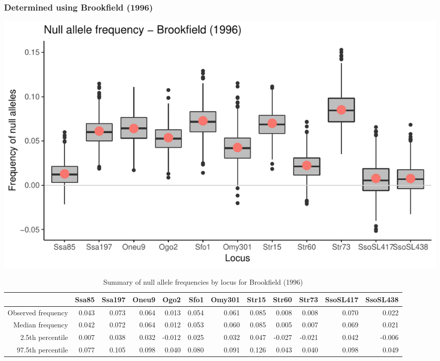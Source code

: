 \documentclass[a4paper]{scrartcl}\usepackage[]{graphicx}\usepackage[]{color}
\makeatletter
\def\maxwidth{ %
  \ifdim\Gin@nat@width>\linewidth
    \linewidth
  \else
    \Gin@nat@width
  \fi
}
\newenvironment{knitrout}{}{} %
\makeatother
\begin{document}
\subsubsection{Determined using Brookfield (1996)}


\begin{knitrout}
\color{fgcolor}
\includegraphics[width=\maxwidth]{PopGenReport_Hatchery-null_all_Brookfield-1} 

\end{knitrout}


\begin{table}[ht]
\centering
\begin{tabular}{rrrrrrrrrrrr}
  \hline
 & Ssa85 & Ssa197 & Oneu9 & Ogo2 & Sfo1 & Omy301 & Str15 & Str60 & Str73 & SsoSL417 & SsoSL438 \\ 
  \hline
Observed frequency & 0.043 & 0.073 & 0.064 & 0.013 & 0.054 & 0.061 & 0.085 & 0.008 & 0.008 & 0.070 & 0.022 \\ 
  Median frequency & 0.042 & 0.072 & 0.064 & 0.012 & 0.053 & 0.060 & 0.085 & 0.005 & 0.007 & 0.069 & 0.021 \\ 
  2.5th percentile & 0.007 & 0.038 & 0.032 & -0.012 & 0.025 & 0.032 & 0.047 & -0.027 & -0.021 & 0.042 & -0.006 \\ 
  97.5th percentile & 0.077 & 0.105 & 0.098 & 0.040 & 0.080 & 0.091 & 0.126 & 0.043 & 0.040 & 0.098 & 0.049 \\ 
   \hline
\end{tabular}
\caption{Summary of null allele frequencies by locus for Brookfield (1996)} 
\end{table}


\FloatBarrier
\end{document}
